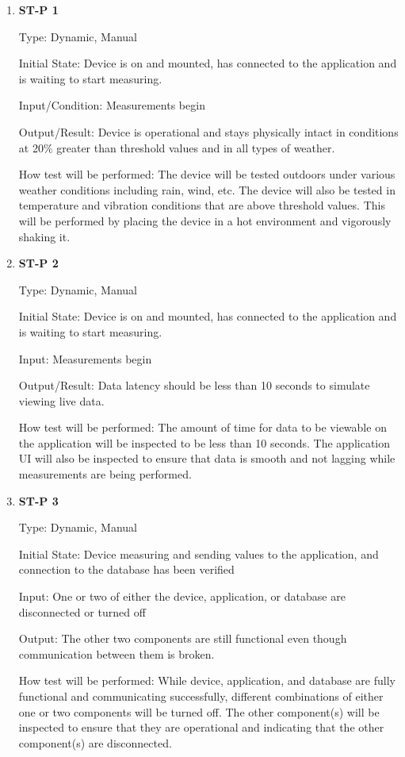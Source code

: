 \documentclass[12pt, titlepage]{article}
\begin{document}
\begin{enumerate}

\item{\bf{ST-P 1}}

Type: Dynamic, Manual
					
Initial State: Device is on and mounted, has connected to the application and is waiting to start measuring.
					
Input/Condition: Measurements begin
					
Output/Result: Device is operational and stays physically intact in conditions at 20\% greater than threshold values and in all types of weather.
					
How test will be performed: The device will be tested outdoors under various weather conditions including rain, wind, etc.
The device will also be tested in temperature and vibration conditions that are above threshold values. This will be performed by placing the device in a hot environment
and vigorously shaking it.
					
\item{\bf{ST-P 2}}

Type: Dynamic, Manual
					
Initial State: Device is on and mounted, has connected to the application and is waiting to start measuring.
					
Input: Measurements begin
					
Output/Result: Data latency should be less than 10 seconds to simulate viewing live data.
					
How test will be performed: The amount of time for data to be viewable on the application will be inspected to be less than 10 seconds.
The application UI will also be inspected to ensure that data is smooth and not lagging while measurements are being performed.

\item{\bf{ST-P 3}}

Type: Dynamic, Manual
					
Initial State: Device measuring and sending values to the application, and connection to the database has been verified
					
Input: One or two of either the device, application, or database are disconnected or turned off
					
Output: The other two components are still functional even though communication between them is broken.
					
How test will be performed: While device, application, and database are fully functional and communicating successfully, different combinations of either one or two components
will be turned off. The other component(s) will be inspected to ensure that they are operational and indicating that the other component(s) are disconnected.

\end{enumerate}
\newpage
\end{document}
